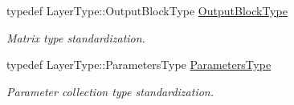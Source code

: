 \begin{DoxyCompactItemize}
typedef Layer\-Type\-::\-Output\-Block\-Type \hyperlink{classffnn_1_1optimizer_1_1_gradient_descent_3_01layer_1_1_convolution_3_01_t_a_r_g_s_01_4_01_4_a24c60e1a115ce2e27567a5b068eaf0a8}{Output\-Block\-Type}
\begin{DoxyCompactList}\small\item\em Matrix type standardization. \end{DoxyCompactList}\item 
typedef Layer\-Type\-::\-Parameters\-Type \hyperlink{classffnn_1_1optimizer_1_1_gradient_descent_3_01layer_1_1_convolution_3_01_t_a_r_g_s_01_4_01_4_a0bbe4560ab81eacf8e75ac5510ad696e}{Parameters\-Type}
\begin{DoxyCompactList}\small\item\em Parameter collection type standardization. \end{DoxyCompactList}\end{DoxyCompactItemize}

